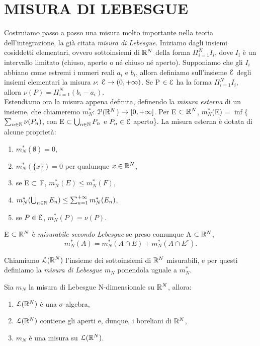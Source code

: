 \documentclass[Completo.tex]{subfiles}
\begin{document}
	\section{MISURA DI LEBESGUE}
	Costruiamo passo a passo una misura molto importante nella teoria dell'integrazione, la già citata \textit{misura di Lebesgue}. Iniziamo dagli insiemi cosiddetti elementari, ovvero sottoinsiemi di $\bb[R]^{N}$ della forma $\Pi_{i=1}^N I_i$, dove $I_i$ è un intervallo limitato (chiuso, aperto o né chiuso né aperto). Supponiamo che gli $I_i$ abbiano come estremi i numeri reali $a_i$ e $b_i$, allora definiamo sull'insieme $\eu[E]$ degli insiemi elementari la misura $\nu$: $\eu[E] \ra (0, +\infty)$. Se P $\in \eu[E]$ ha la forma $\Pi_{i=1}^N I_i$, allora $\nu(P) = \Pi_{i=1}^{N} (b_i-a_i)$. \\
	Estendiamo ora la misura appena definita, definendo la \textit{misura esterna} di un insieme, che chiameremo $m_N^{*}$: $\eu[P]$($\bb[R]^{N}$) $\rightarrow [0, +\infty]$. Per E $\sset \bb[R]^{N}$, $m_N^{*}$(E) = $\inf$\{$\sum_{n \in \bb[N]} \nu(P_n)$, con E $\sset \bigcup_{n \in \bb[N]} P_n$ e $P_n \in \eu[E]$ aperto\}. La misura esterna è dotata di alcune proprietà:
	\begin{Prop}
		\begin{enumerate}
			\item $m_N^{*}(\emptyset) = 0$,
			\item $m_N^{*}(\{x\}) = 0$ per qualunque $x \in \bb[R]^{N}$,
			\item se E $\subset$ F, $m_N^{*}(E) \leq m_N^{*}(F)$,
			\item $m_N^{*}(\bigcup_{n \in \bb[N]}E_n) \leq \sum_{n=1}^{+\infty} m_N^{*}(E_n)$,
			\item se $P \in \eu[E]$, $m_N^{*}(P) = \nu(P)$.
		\end{enumerate}
	\end{Prop}
	\begin{Def}
		E $\sset \bb[R]^{N}$ è \textit{misurabile secondo Lebesgue} se preso comunque A $\sset \bb[R]^{N}$,
		\begin{equation*}
		m_N^{*}(A) = m_N^{*}(A\cap E) + m_N^{*}(A \cap E^{c}).
		\end{equation*}
	\end{Def}
	\begin{Def}
		Chiamiamo $\eu[L](\bb[R]^{N})$ l'insieme dei sottoinsiemi di $\bb[R]^{N}$ misurabili, e per questi definiamo la \textit{misura di Lebesgue} $m_N$ ponendola uguale a $m_N^{*}$.
	\end{Def}
	\begin{Th}
		Sia $m_N$ la misura di Lebesgue N-dimensionale su $\bb[R]^{N}$, allora:
		\begin{enumerate}
			\item $\eu[L](\bb[R]^{N})$ è una $\sigma$-algebra,
			\item $\eu[L](\bb[R]^{N})$ contiene gli aperti e, dunque, i boreliani di $\bb[R]^{N}$,
			\item $m_N$ è una misura su $\eu[L](\bb[R]^{N})$.
		\end{enumerate}
	\end{Th}
\end{document}
